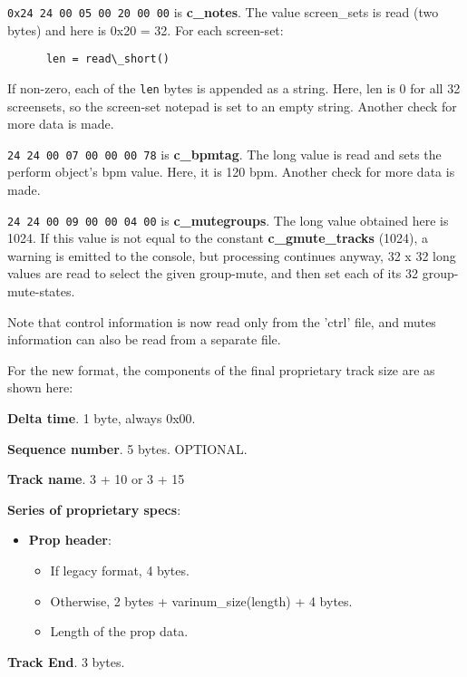    \texttt{0x24 24 00 05 00 20 00 00} is \textbf{c\_notes}.
   The value screen\_sets is read (two bytes) and
   here is 0x20 = 32.  For each screen-set:

   \begin{verbatim}
      len = read\_short()
   \end{verbatim}

   If non-zero, each of the \texttt{len} bytes is appended as a string.
   Here, len is 0 for all 32 screensets, so the screen-set notepad is set to
   an empty string.
   Another check for more data is made.

   \texttt{24 24 00 07 00 00 00 78}
   is \textbf{c\_bpmtag}.  The long value is read and sets the
   perform object's bpm value.  Here, it is 120 bpm.
   Another check for more data is made.

   \texttt{24 24 00 09 00 00 04 00}
   is \textbf{c\_mutegroups}.  The long value obtained here is
   1024.  If this value is not equal to the constant
   \textbf{c\_gmute\_tracks} (1024), a warning is emitted to the console,
   but processing continues anyway, 32 x 32 long values are read to select
   the given group-mute, and then set each of its 32 group-mute-states.

   Note that control information is now read only from the 'ctrl' file,
   and mutes information can also be read from a separate file.

   For the new format, the components of the final proprietary track size are
   as shown here:

   \begin{enumber}
      \item \textbf{Delta time}.  1 byte, always 0x00.
      \item \textbf{Sequence number}.  5 bytes.  OPTIONAL.
      \item \textbf{Track name}. 3 + 10 or 3 + 15
      \item \textbf{Series of proprietary specs}:
      \begin{itemize}
         \item \textbf{Prop header}:
         \begin{itemize}
            \item If legacy format, 4 bytes.
            \item Otherwise, 2 bytes + varinum\_size(length) + 4 bytes.
            \item Length of the prop data.
         \end{itemize}
      \end{itemize}
      \item \textbf{Track End}. 3 bytes.
   \end{enumber}

